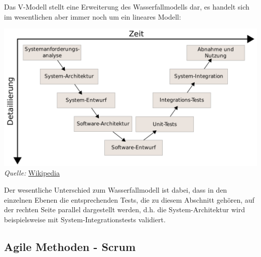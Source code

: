 \documentclass{article}
\begin{document}
Das V-Modell stellt eine Erweiterung des Wasserfallmodells dar, es handelt sich im wesentlichen aber immer noch um ein lineares Modell:
\begin{center}
    \includegraphics[scale=0.15]{../../media/V-Modell.png} \\
    \textit{Quelle:} \href{https://de.wikipedia.org/wiki/V-Modell}{Wikipedia}
\end{center}
Der wesentliche Unterschied zum Wasserfallmodell ist dabei, dass in den einzelnen Ebenen die entsprechenden Tests, die zu diesem Abschnitt gehören, auf der rechten Seite parallel dargestellt werden, d.h. die System-Architektur wird beispielsweise mit System-Integrationstests validiert.

\subsection{Agile Methoden - Scrum}
\end{document}
